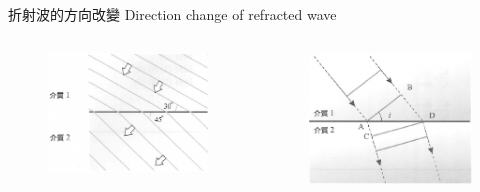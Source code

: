 \documentclass[beamer=true]{standalone}
\begin{document}
\begin{frame}{折射波的方向改變 Direction change of refracted wave}
    \begin{columns}
        \begin{figure}
            \centering
            \includegraphics[width=\linewidth]{images/Screenshot 2023-09-27 at 8.51.39 PM.png}


        \end{figure}
        \begin{figure}
            \centering
            \includegraphics[width=1\linewidth]{images/Screenshot 2023-09-27 at 8.47.44 PM.png}

        \end{figure}
    \end{columns}


\end{frame}
\end{document}
